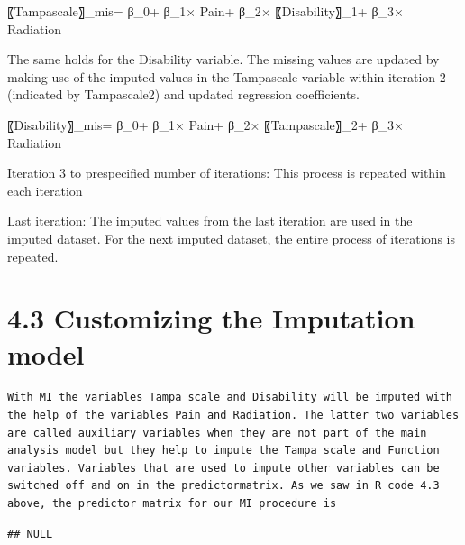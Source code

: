 \documentclass[]{book}
\newenvironment{Shaded}{\begin{snugshade}}{\end{snugshade}}
\newcommand{\OperatorTok}[1]{\textcolor[rgb]{0.81,0.36,0.00}{\textbf{#1}}}
\newcommand{\NormalTok}[1]{#1}
\begin{document}
〖Tampascale〗\_mis= β\_0+ β\_1× Pain+ β\_2× 〖Disability〗\_1+ β\_3×
Radiation

The same holds for the Disability variable. The missing values are
updated by making use of the imputed values in the Tampascale variable
within iteration 2 (indicated by Tampascale2) and updated regression
coefficients.

〖Disability〗\_mis= β\_0+ β\_1× Pain+ β\_2× 〖Tampascale〗\_2+ β\_3×
Radiation

Iteration 3 to prespecified number of iterations: This process is
repeated within each iteration

Last iteration: The imputed values from the last iteration are used in
the imputed dataset. For the next imputed dataset, the entire process of
iterations is repeated.

\section{4.3 Customizing the Imputation
model}\label{customizing-the-imputation-model}

\begin{verbatim}
With MI the variables Tampa scale and Disability will be imputed with the help of the variables Pain and Radiation. The latter two variables are called auxiliary variables when they are not part of the main analysis model but they help to impute the Tampa scale and Function variables. Variables that are used to impute other variables can be switched off and on in the predictormatrix. As we saw in R code 4.3 above, the predictor matrix for our MI procedure is
\end{verbatim}

\begin{Shaded}
\end{Shaded}

\begin{verbatim}
## NULL
\end{verbatim}
\end{document}
